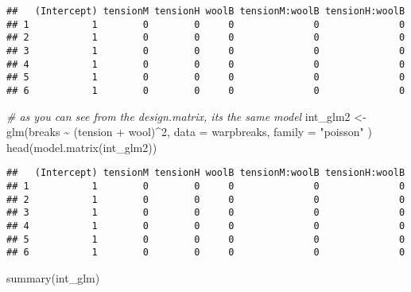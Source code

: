\documentclass[
  oneside]{book}
\newenvironment{Shaded}{\begin{snugshade}}{\end{snugshade}}
\newcommand{\AttributeTok}[1]{\textcolor[rgb]{0.77,0.63,0.00}{#1}}
\newcommand{\CommentTok}[1]{\textcolor[rgb]{0.56,0.35,0.01}{\textit{#1}}}
\newcommand{\DecValTok}[1]{\textcolor[rgb]{0.00,0.00,0.81}{#1}}
\newcommand{\FunctionTok}[1]{\textcolor[rgb]{0.00,0.00,0.00}{#1}}
\newcommand{\NormalTok}[1]{#1}
\newcommand{\OtherTok}[1]{\textcolor[rgb]{0.56,0.35,0.01}{#1}}
\newcommand{\SpecialCharTok}[1]{\textcolor[rgb]{0.00,0.00,0.00}{#1}}
\newcommand{\StringTok}[1]{\textcolor[rgb]{0.31,0.60,0.02}{#1}}
\begin{document}
\begin{verbatim}
##   (Intercept) tensionM tensionH woolB tensionM:woolB tensionH:woolB
## 1           1        0        0     0              0              0
## 2           1        0        0     0              0              0
## 3           1        0        0     0              0              0
## 4           1        0        0     0              0              0
## 5           1        0        0     0              0              0
## 6           1        0        0     0              0              0
\end{verbatim}

\begin{Shaded}
\begin{Highlighting}[]
\CommentTok{\# as you can see from the design.matrix, it\textquotesingle{}s the same model}
\NormalTok{int\_glm2 }\OtherTok{\textless{}{-}} \FunctionTok{glm}\NormalTok{(breaks }\SpecialCharTok{\textasciitilde{}}\NormalTok{ (tension }\SpecialCharTok{+}\NormalTok{ wool)}\SpecialCharTok{\^{}}\DecValTok{2}\NormalTok{,}
  \AttributeTok{data =}\NormalTok{ warpbreaks, }\AttributeTok{family =} \StringTok{"poisson"}
\NormalTok{)}
\FunctionTok{head}\NormalTok{(}\FunctionTok{model.matrix}\NormalTok{(int\_glm2))}
\end{Highlighting}
\end{Shaded}

\begin{verbatim}
##   (Intercept) tensionM tensionH woolB tensionM:woolB tensionH:woolB
## 1           1        0        0     0              0              0
## 2           1        0        0     0              0              0
## 3           1        0        0     0              0              0
## 4           1        0        0     0              0              0
## 5           1        0        0     0              0              0
## 6           1        0        0     0              0              0
\end{verbatim}

\begin{Shaded}
\begin{Highlighting}[]
\FunctionTok{summary}\NormalTok{(int\_glm)}
\end{Highlighting}
\end{Shaded}
\end{document}
